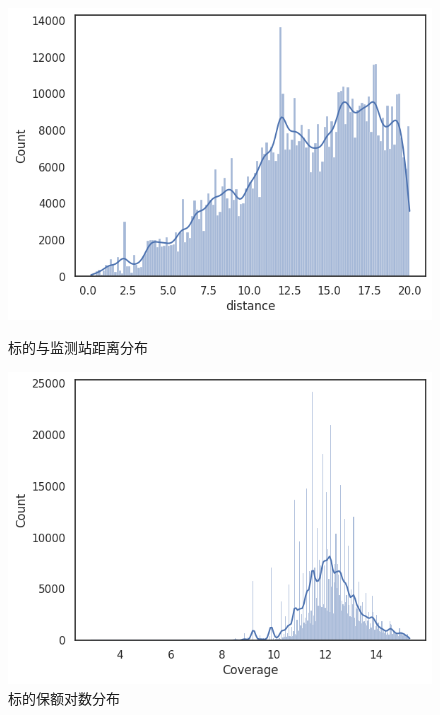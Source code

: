 \begin{figure}[H]
    \begin{minipage}{0.48\linewidth}
        \includegraphics[width=\linewidth]{lib/img/olsdistance.png}
        \caption{标的与监测站距离分布}
    \end{minipage}
    \begin{minipage}{0.48\linewidth}
        \includegraphics[width=\linewidth]{lib/img/coverage.png}
        \caption{标的保额对数分布}
    \end{minipage}
\end{figure}
